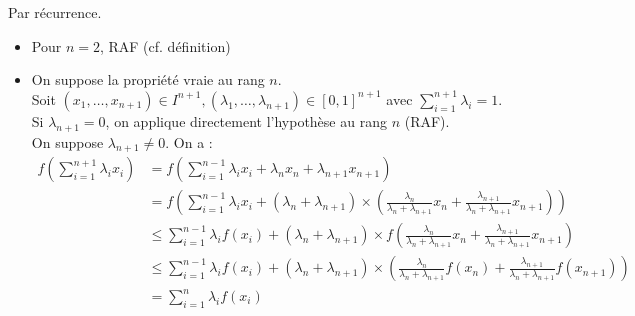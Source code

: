 \documentclass[../main.tex]{subfiles}
\begin{document}
\noindent Par récurrence. 
\begin{itemize}
    \item Pour $n = 2$, RAF (cf. définition)
    \item On suppose la propriété vraie au rang $n$. \\
    Soit $(x_1, \ldots, x_{n+1}) \in I^{n+1}, (\lambda_1, \ldots, \lambda_{n+1}) \in [0, 1]^{n+1}$ avec $\sum\limits_{i=1}^{n+1} \lambda_i = 1$. \\
    Si $\lambda_{n+1} = 0$, on applique directement l'hypothèse au rang $n$ (RAF). \\
    On suppose $\lambda_{n+1} \neq 0$. On a : 
    \begin{align*}
        f \left( \sum_{i=1}^{n+1} \lambda_i x_i \right) &= f \left( \sum_{i=1}^{n-1} \lambda_i x_i + \lambda_n x_n + \lambda_{n+1}x_{n+1} \right) \\
        &= f \left( \sum_{i=1}^{n-1} \lambda_i x_i + (\lambda_n + \lambda_{n+1}) \times \left( \frac{\lambda_n}{\lambda_n + \lambda_{n+1}}x_n + \frac{\lambda_{n+1}}{\lambda_n + \lambda_{n+1}}x_{n+1} \right) \right) \\
        &\leq \sum_{i=1}^{n-1} \lambda_i f(x_i) + (\lambda_n + \lambda_{n+1}) \times f\left( \frac{\lambda_n}{\lambda_n + \lambda_{n+1}}x_n + \frac{\lambda_{n+1}}{\lambda_n + \lambda_{n+1}}x_{n+1} \right) \\
        &\leq \sum_{i=1}^{n-1} \lambda_i f(x_i) + (\lambda_n + \lambda_{n+1}) \times \left( \frac{\lambda_n}{\lambda_n + \lambda_{n+1}}f(x_n) + \frac{\lambda_{n+1}}{\lambda_n + \lambda_{n+1}}f(x_{n+1}) \right) \\
        &= \sum_{i=1}^{n} \lambda_i f(x_i)
    \end{align*}
\end{itemize}
\end{document}

